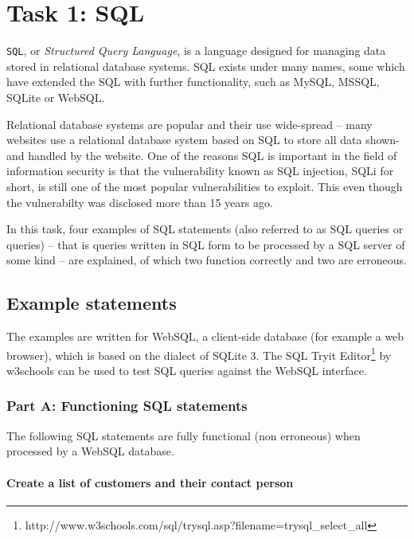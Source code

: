 %

\section{Task 1: SQL}
\texttt{SQL}, or \textit{Structured Query Language}, is a language designed for
managing data stored in relational database systems. SQL exists under many names,
some which have extended the SQL with further functionality, such as MySQL, MSSQL,
SQLite or WebSQL.

Relational database systems are popular and their use wide-spread -- many websites
use a relational database system based on SQL to store all data shown- and handled
by the website. One of the reasons SQL is important in the field of information
security is that the vulnerability known as SQL injection, SQLi for short, is still
one of the most popular vulnerabilities to exploit\cite{MOTHBRDSQL}. This even though
the vulnerabilty was disclosed more than 15 years ago.

In this task, four examples of SQL statements (also referred to as SQL queries or queries)
-- that is queries written in SQL form to be processed by a SQL server of some kind --
are explained, of which two function correctly and two are erroneous.

\subsection{Example statements}

The examples are written for WebSQL, a client-side database\cite{W3CWEBSQL}
(for example a web browser), which is based on the dialect of SQLite 3\cite{W3CWEBSQL}.
The SQL Tryit Editor\footnote{http://www.w3schools.com/sql/trysql.asp?filename=trysql\_select\_all}
by w3schools can be used to test SQL queries against the WebSQL interface.

\subsubsection{Part A: Functioning SQL statements}
The following SQL statements are fully functional (non erroneous) when processed
by a WebSQL database. 

\paragraph{Create a list of customers and their contact person}

